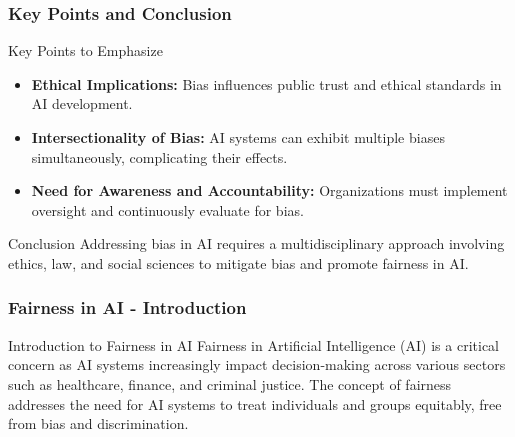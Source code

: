 \documentclass{beamer}
\begin{document}
\begin{frame}[fragile]
    \frametitle{Key Points and Conclusion}
    \begin{block}{Key Points to Emphasize}
        \begin{itemize}
            \item \textbf{Ethical Implications:} Bias influences public trust and ethical standards in AI development.
            \item \textbf{Intersectionality of Bias:} AI systems can exhibit multiple biases simultaneously, complicating their effects.
            \item \textbf{Need for Awareness and Accountability:} Organizations must implement oversight and continuously evaluate for bias.
        \end{itemize}
    \end{block}
    
    \begin{block}{Conclusion}
        Addressing bias in AI requires a multidisciplinary approach involving ethics, law, and social sciences to mitigate bias and promote fairness in AI.
    \end{block}
\end{frame}

\begin{frame}[fragile]
    \frametitle{Fairness in AI - Introduction}
    \begin{block}{Introduction to Fairness in AI}
        Fairness in Artificial Intelligence (AI) is a critical concern as AI systems increasingly impact decision-making across various sectors such as healthcare, finance, and criminal justice. 
        The concept of fairness addresses the need for AI systems to treat individuals and groups equitably, free from bias and discrimination.
    \end{block}
\end{frame}
\end{document}
